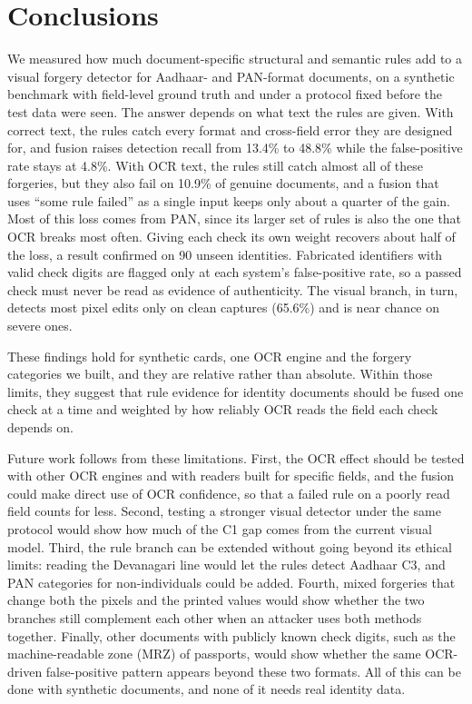 \documentclass[12pt]{article}
\begin{document}
\section{Conclusions}
\label{sec:conclusion}

We measured how much document-specific structural and semantic rules
add to a visual forgery detector for Aadhaar- and PAN-format documents,
on a synthetic benchmark with field-level ground truth and under a
protocol fixed before the test data were seen. The answer depends on what text the rules are given. With correct text, the rules catch every format and cross-field error they are designed for, and fusion raises detection recall from 13.4\% to 48.8\% while the false-positive rate stays at 4.8\%. With OCR text, the rules still catch almost all of these forgeries, but they also fail on 10.9\% of genuine documents, and a fusion that uses ``some rule failed'' as a single input keeps only about a quarter of the gain. Most of this loss comes from PAN, since its larger set of rules is also the one that OCR breaks most often. Giving each check its own weight recovers about
half of the loss, a result confirmed on 90 unseen identities. Fabricated
identifiers with valid check digits are flagged only at each system's
false-positive rate, so a passed check must never be read as evidence of
authenticity. The visual branch, in turn, detects most pixel edits
only on clean captures (65.6\%) and is near chance on severe ones.

These findings hold for synthetic cards, one OCR engine and the forgery
categories we built, and they are relative rather than absolute. Within
those limits, they suggest that rule evidence for identity documents
should be fused one check at a time and weighted by how reliably OCR
reads the field each check depends on.

Future work follows from these limitations. First, the OCR effect should be tested with other OCR engines and with readers built for specific fields, and the fusion could make direct use of OCR confidence, so that a failed rule on a poorly read field counts for less. Second, testing a stronger visual detector under the same protocol would show how much of the C1 gap comes from the current visual model. Third, the rule branch can be extended without going beyond its ethical limits: reading the Devanagari line would let the rules detect Aadhaar C3, and PAN categories for non-individuals could be added. Fourth, mixed forgeries that change both the pixels and the printed values would show whether the two branches still complement each other when an attacker uses both methods together. Finally, other documents with publicly known check digits, such as the machine-readable zone (MRZ) of passports, would show whether the same OCR-driven false-positive pattern appears beyond these two formats. All of this can be done with synthetic documents, and none of it needs real identity data.
\end{document}
